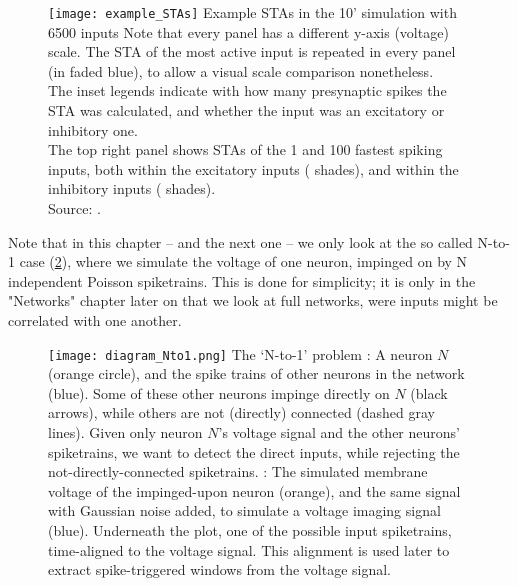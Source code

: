 \begin{figure}
    \hspace*{-3em}
    \texttt{[image: example\_STAs]}
    \vspace*{1em}
    \captionn
        {Example STAs in the 10' simulation with 6500 inputs}
        {
        Note that every panel has a different y-axis (voltage) scale. The STA of the most active input is repeated in every panel (in faded blue), to allow a visual scale comparison nonetheless.\\
        The inset legends indicate with how many presynaptic spikes the STA was calculated, and whether the input was an excitatory or inhibitory one.\\
        The top right panel shows STAs of the 1 and 100 fastest spiking inputs, both within the excitatory inputs ( shades), and within the inhibitory inputs ( shades).\\
        Source: .
        }
    \label{fig:example_STAs}
\end{figure}

Note that in this chapter -- and the next one -- we only look at the so called N-to-1 case (\cref{fig:diagram_Nto1}), where we simulate the voltage of one neuron, impinged on by N independent Poisson spiketrains. This is done for simplicity; it is only in the "Networks" chapter later on that we look at full networks, were inputs might be correlated with one another.

\begin{figure}
    \vspace*{2em}
    \hspace*{-1em}
    \texttt{[image: diagram\_Nto1.png]}
    \vspace*{-1.4em}
    \captionn
        {The `N-to-1' problem}
        {\Left: A neuron $N$ (orange circle), and the spike trains of other neurons in the network (blue). Some of these other neurons impinge directly on $N$ (black arrows), while others are not (directly) connected (dashed gray lines). Given only neuron $N$'s voltage signal and the other neurons' spiketrains, we want to detect the direct inputs, while rejecting the not-directly-connected spiketrains.\newline
        \Right: The simulated membrane voltage of the impinged-upon neuron (orange), and the same signal with Gaussian noise added, to simulate a voltage imaging signal (blue). Underneath the plot, one of the possible input spiketrains, time-aligned to the voltage signal.
        This alignment is used later to extract spike-triggered windows from the voltage signal.}
    \label{fig:diagram_Nto1}
\end{figure}

